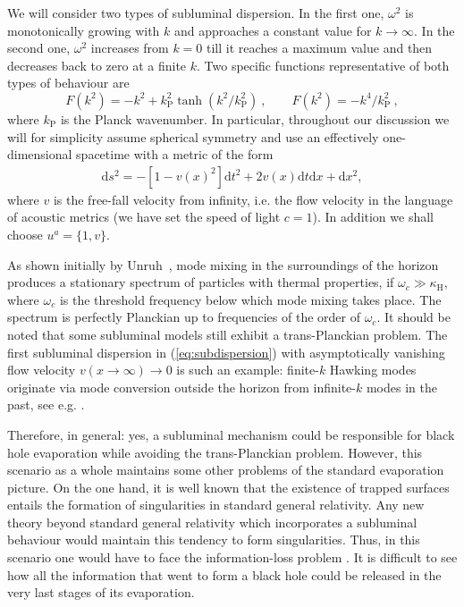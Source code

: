 \documentclass[12pt]{article}
\newcommand{\diff}{\text{d}}
\begin{document}
We will consider two types of subluminal dispersion. In the first one, $\omega^2$
is monotonically growing with $k$ and approaches a constant value for 
$k \to
\infty$. In the second one, $\omega^2$ increases from $k=0$ till it reaches a
maximum value and then decreases back to zero at a finite $k$.
Two specific functions representative of both types of behaviour are
%
\begin{equation}
F(k^2)= -k^2 + k_\text{P}^2 \tanh(k^2/k_\text{P}^2)~,
\qquad
F(k^2)= - k^4/k_\text{P}^2~,
\label{eq:subdispersion}
\end{equation}
%
where $k_\text{P}$ is the Planck wavenumber. In particular, throughout our discussion
we will for simplicity assume spherical symmetry and use an effectively one-dimensional spacetime with a metric of the form 
\begin{align}
\diff s^2=-[1-v(x)^2]\diff t^2+2v(x)\diff t\diff x+\diff x^2,
\label{eq:hydrometric}
\end{align}
where $v$ is the free-fall velocity from infinity, i.e. the flow velocity in the language of acoustic metrics (we have set the speed of light $c=1$). In addition we shall choose  $u^a =\{1,v\}$.

As shown initially by Unruh~\cite{unruh-sub}, mode mixing in the surroundings of the horizon produces a stationary
spectrum of particles with thermal properties,  if $\omega_c \gg \kappa_\text{H}$,
where $\omega_c$ is the threshold frequency below which  mode mixing takes
place. The spectrum is perfectly
Planckian up to frequencies of the order of $\omega_c$.
It should be noted that some subluminal models still exhibit a trans-Planckian problem. The first subluminal dispersion in (\ref{eq:subdispersion}) with asymptotically vanishing flow velocity $v(x\to\infty)\to 0$  is such an example: finite-$k$ Hawking modes originate via mode conversion outside the horizon from infinite-$k$ modes in the past, see e.g. \cite{Jacobson:1999zk}.


Therefore, in general: yes, a subluminal mechanism could be responsible for black
hole evaporation while avoiding the trans-Planckian problem. However, this scenario as
a whole maintains some other problems of the standard evaporation picture. On the one hand, it is
well known that the existence of trapped surfaces entails the
formation of singularities in standard general relativity. Any new theory beyond
standard general relativity which incorporates a subluminal behaviour would maintain
this tendency to form singularities. Thus, in this scenario one would have to
face the information-loss problem \cite{hawking-info-loss}. It is difficult to see how all the information
that went to form a black hole could be released in the very last stages of its
evaporation. 
\end{document}

